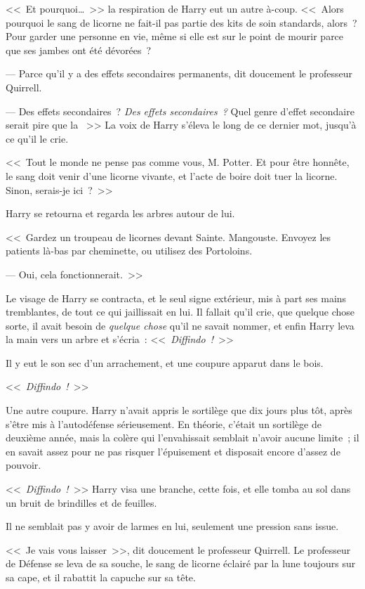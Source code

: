 <<~Et pourquoi…~>> la respiration de Harry eut un autre à-coup. <<~Alors pourquoi le sang de licorne ne fait-il pas partie des kits de soin standards, alors~? Pour garder une personne en vie, même si elle est sur le point de mourir parce que ses jambes ont été dévorées~?

--- Parce qu'il y a des effets secondaires permanents, dit doucement le professeur Quirrell.

--- Des effets secondaires~? \emph{Des effets secondaires~?} Quel genre d'effet secondaire serait pire que la ~>> La voix de Harry s'éleva le long de ce dernier mot, jusqu'à ce qu'il le crie.

<<~Tout le monde ne pense pas comme vous, M. Potter. Et pour être honnête, le sang doit venir d'une licorne vivante, et l'acte de boire doit tuer la licorne. Sinon, serais-je ici~?~>>

Harry se retourna et regarda les arbres autour de lui.

<<~Gardez un troupeau de licornes devant Sainte. Mangouste. Envoyez les patients là-bas par cheminette, ou utilisez des Portoloins.

--- Oui, cela fonctionnerait.~>>

Le visage de Harry se contracta, et le seul signe extérieur, mis à part ses mains tremblantes, de tout ce qui jaillissait en lui. Il fallait qu'il crie, que quelque chose sorte, il avait besoin de \emph{quelque chose} qu'il ne savait nommer, et enfin Harry leva la main vers un arbre et s'écria~: <<~\emph{Diffindo~!}~>>

Il y eut le son sec d'un arrachement, et une coupure apparut dans le bois.

<<~\emph{Diffindo~!}~>>

Une autre coupure. Harry n'avait appris le sortilège que dix jours plus tôt, après s'être mis à l'autodéfense sérieusement. En théorie, c'était un sortilège de deuxième année, mais la colère qui l'envahissait semblait n'avoir aucune limite~; il en savait assez pour ne pas risquer l'épuisement et disposait encore d'assez de pouvoir.

<<~\emph{Diffindo~!}~>> Harry visa une branche, cette fois, et elle tomba au sol dans un bruit de brindilles et de feuilles.

Il ne semblait pas y avoir de larmes en lui, seulement une pression sans issue.

<<~Je vais vous laisser~>>, dit doucement le professeur Quirrell. Le professeur de Défense se leva de sa souche, le sang de licorne éclairé par la lune toujours sur sa cape, et il rabattit la capuche sur sa tête.
